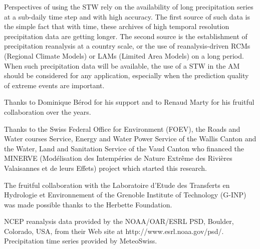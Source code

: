\documentclass[hess]{copernicus}
\begin{document}
Perspectives of using the STW rely on the availability of long precipitation series at a sub-daily time step and with high accuracy. The first source of such data is the simple fact that with time, these archives of high temporal resolution precipitation data are getting longer. The second source is the establishment of precipitation reanalysis at a country scale, or the use of reanalysis-driven RCMs (Regional Climate Models) or LAMs (Limited Area Models) on a long period. When such precipitation data will be available, the use of a STW in the AM should be considered for any application, especially when the prediction quality of extreme events are important.



\begin{acknowledgements}
Thanks to Dominique B\'{e}rod for his support and to Renaud Marty for his fruitful collaboration over the years. 

Thanks to the Swiss Federal Office for Environment (FOEV), the Roads and Water courses Service, Energy and Water Power Service of the Wallis Canton and the Water, Land and Sanitation Service of the Vaud Canton who financed the MINERVE (Mod\'{e}lisation des Intemp\'{e}ries de Nature Extr\^{e}me des Rivi\`{e}res Valaisannes et de leurs Effets) project which started this research. 

The fruitful collaboration with the Laboratoire d'Etude des Transferts en Hydrologie et Environnement of the Grenoble Institute of Technology (G-INP) was made possible thanks to the Herbette Foundation. 

NCEP reanalysis data provided by the NOAA/OAR/ESRL PSD, Boulder, Colorado, USA, from their Web site at http://www.esrl.noaa.gov/psd/. Precipitation time series provided by MeteoSwiss. 
\end{acknowledgements}









\end{document}
